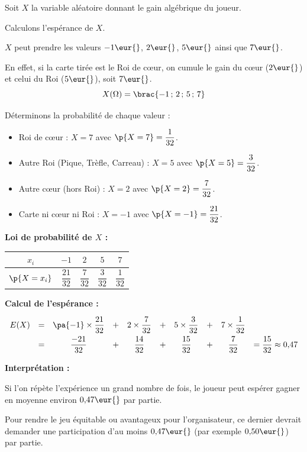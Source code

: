 \begin{methode}
	Soit $X$ la variable aléatoire donnant le gain algébrique du joueur.

	Calculons l'espérance de $X$.

	\rule{0mm}{25mm}

	\begin{correction}
		$X$ peut prendre les valeurs $-1\eur{}$, $2\eur{}$, $5\eur{}$ ainsi que $7\eur{}$.

		En effet, si la carte tirée est le Roi de c\oe ur, on cumule le gain du c\oe ur ($2\eur{}$) et celui du Roi ($5\eur{}$), soit $7\eur{}$.
		\[
			X(\Omega) = \brac{-1\,;\,2\,;\,5\,;\,7}
		\]

		Déterminons la probabilité de chaque valeur :
		\begin{itemize}
			\item Roi de c\oe ur : $X = 7$ avec $\p{X=7} = \dfrac{1}{32}$.
			\item Autre Roi (Pique, Trèfle, Carreau) : $X = 5$ avec $\p{X=5} = \dfrac{3}{32}$.
			\item Autre c\oe ur (hors Roi) : $X = 2$ avec $\p{X=2} = \dfrac{7}{32}$.
			\item Carte ni c\oe ur ni Roi : $X = -1$ avec $\p{X=-1} = \dfrac{21}{32}$.
		\end{itemize}

		\textbf{Loi de probabilité de $X$ :}

		\begin{center}
			\begin{tabular}{|c|c|c|c|c|} \hline
				\ccg $x_i$                             & $-1$             & $2$             & $5$             & $7$             \\ \hline
				\rule[-4mm]{0mm}{11mm}\ccg $\p{X=x_i}$ & $\dfrac{21}{32}$ & $\dfrac{7}{32}$ & $\dfrac{3}{32}$ & $\dfrac{1}{32}$ \\ \hline
			\end{tabular}
		\end{center}

		\textbf{Calcul de l'espérance :}
		\[
			\def\arraystretch{2}
			\begin{array}{rccccccccl}
				E(X) & = & \pa{-1} \times \dfrac{21}{32} & + & 2 \times \dfrac{7}{32} & + & 5 \times \dfrac{3}{32} & + & 7 \times \dfrac{1}{32} &                                 \\
				     & = & \dfrac{-21}{32}               & + & \dfrac{14}{32}         & + & \dfrac{15}{32}         & + & \dfrac{7}{32}          & = \dfrac{15}{32} \approx 0{,}47
			\end{array}
		\]

		\textbf{Interprétation :}

		Si l'on répète l'expérience un grand nombre de fois, le joueur peut espérer gagner en moyenne environ $0{,}47\eur{}$ par partie.

		Pour rendre le jeu équitable ou avantageux pour l'organisateur, ce dernier devrait demander une participation d'au moins $0{,}47\eur{}$ (par exemple $0{,}50\eur{}$) par partie.
	\end{correction}
\end{methode}
